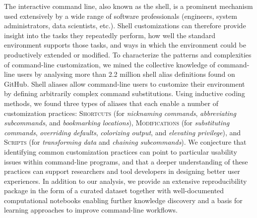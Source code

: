 The interactive command line, also known as the shell, is a prominent mechanism used extensively by a wide range of software professionals (engineers, system administrators, data scientists, etc.). Shell customizations can therefore provide insight into the tasks they repeatedly perform, how well the standard environment supports those tasks, and ways in which the environment could be productively extended or modified.
To characterize the patterns and complexities of command-line customization, we mined the collective knowledge of command-line users by analysing more than 2.2 million shell alias definitions found on GitHub.
Shell aliases allow command-line users to customize their environment by defining arbitrarily complex command substitutions.
Using inductive coding methods, we found three types of aliases that each enable a number of customization practices: 
\textsc{Shortcuts} (for \emph{nicknaming commands}, \emph{abbreviating subcommands}, and \emph{bookmarking locations}),
\textsc{Modifications} (for \emph{substituting commands}, \emph{overriding defaults}, \emph{colorizing output}, and \emph{elevating privilege}),
and \textsc{Scripts} (for \emph{transforming data} and \emph{chaining subcommands}).
We conjecture that identifying common customization practices can point to particular usability issues within command-line programs, and that a deeper understanding of these practices can support researchers and tool developers in designing better user experiences.
In addition to our analysis, we provide an extensive reproducibility package in the form of a curated dataset together with well-documented computational notebooks enabling further knowledge discovery and a basis for learning approaches to improve command-line workflows.
